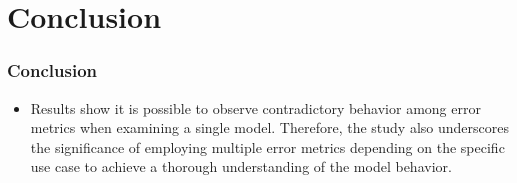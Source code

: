 \documentclass[xcolor={dvipsnames}]{beamer}
\begin{document}
\section{Conclusion}

\begin{frame}
\frametitle{Conclusion}

\begin{itemize}
    \item Results show it is possible to observe contradictory behavior among error metrics when examining a single model. Therefore, the study also underscores the significance of employing multiple error metrics depending on the specific use case to achieve a thorough understanding of the model behavior.

\end{itemize}

\end{frame}
\end{document}
